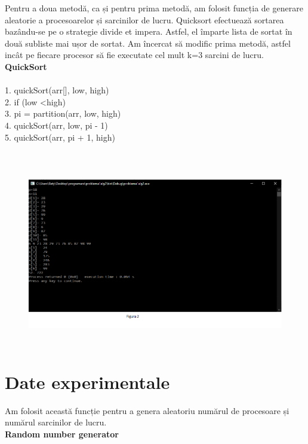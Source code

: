 \documentclass{article}
\begin{document}
  Pentru a doua metodă, ca și pentru prima metodă, am folosit funcția de generare aleatorie a procesoarelor și sarcinilor de lucru. Quicksort efectuează sortarea bazându-se pe o strategie divide et impera. Astfel, el împarte lista de sortat în două subliste mai ușor de sortat. Am încercat să modific prima metodă, astfel incât pe fiecare procesor să fie executate cel mult k=3 sarcini de lucru. \\
  
 \hspace{1cm} \textbf{QuickSort} \\ 
  \\
  1. quickSort(arr[], low, high) \\
  2. if (low \textless high) \\ 
  3. pi = partition(arr, low, high) \\
  4. quickSort(arr, low, pi - 1) \\
  5. quickSort(arr, pi + 1, high) \\
    \\
 \begin{figure}[htp]
\centering
\includegraphics[width=15cm,height=8cm]{figura2}
\end{figure}
  


\newpage
\section{Date experimentale}
 Am folosit această funcție pentru a genera aleatoriu numărul de procesoare și numărul sarcinilor de lucru.  \\
 
\hspace{2cm} \textbf{Random number generator}\\
\end{document}
